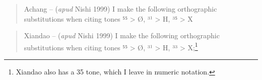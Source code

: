 \begin{quote}
Achang -- (\emph{apud} Nishi 1999) I make the following orthographic
substitutions when citing tones ⁵⁵ \textgreater{} Ø, ³¹ \textgreater{}
H, ³⁵ \textgreater{} X
\end{quote}

\begin{quote}
Xiandao -- (\emph{apud} Nishi 1999) I make the following orthographic
substitutions when citing tones ⁵⁵ \textgreater{} Ø, ³¹ \textgreater{}
H, ³³ \textgreater{} X;\footnote{Xiandao also has a 35 tone, which I
  leave in numeric notation.}
\end{quote}

